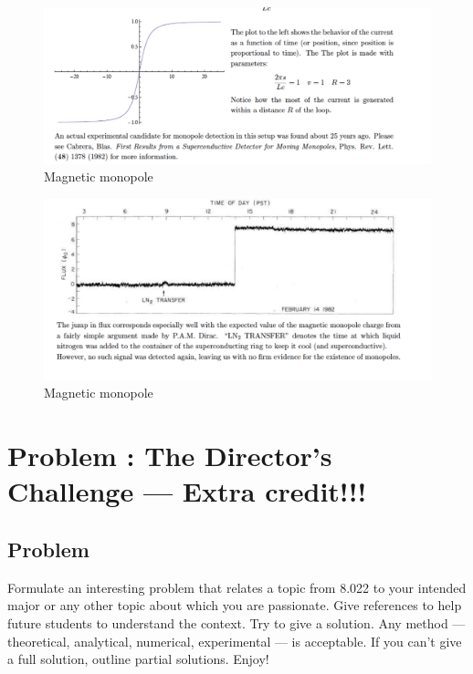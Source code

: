\documentclass[solutions]{esg8022pset}
\begin{document}
 \begin{figure}[H]
    \centering
    \includegraphics[width = 15cm]{monopole_sol_c}
    \caption{Magnetic monopole}
   \end{figure}

     \begin{figure}[H]
    \centering
    \includegraphics[width = 15cm]{monopole_sol_d}
    \caption{Magnetic monopole}
\end{figure}

\section{Problem \thesection: The Director's Challenge --- Extra credit!!!}
\subsection{Problem}
  Formulate an interesting problem that relates a topic from 8.022 to your
  intended major or any other topic about which you are passionate.  Give references
  to help future students to understand the context.  Try to give a solution.
  Any method --- theoretical, analytical, numerical, experimental --- is acceptable.
  If you can't give a full solution, outline partial solutions. Enjoy!
\end{document}
